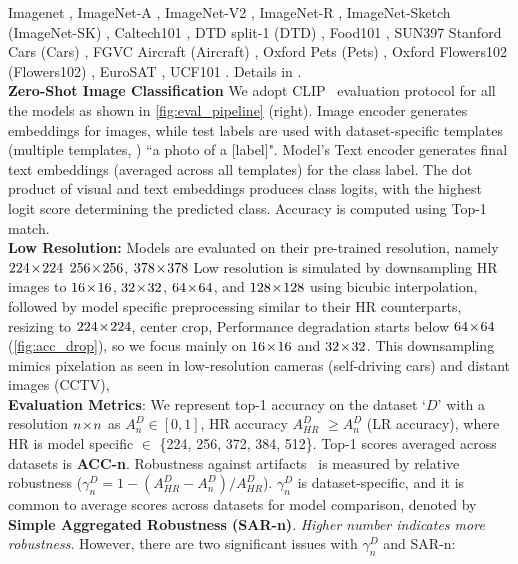 Imagenet , 
ImageNet-A , 
ImageNet-V2 , 
ImageNet-R , 
ImageNet-Sketch (ImageNet-SK) , 
Caltech101 , 
DTD split-1 (DTD) , 
Food101 , 
SUN397 
Stanford Cars (Cars) , 
FGVC Aircraft (Aircraft) ,
Oxford Pets (Pets) , 
Oxford Flowers102 (Flowers102) , 
EuroSAT , 
UCF101 . 
Details in \Supp. \vspace{4pt}\\         
\noindent\textbf{Zero-Shot Image Classification}
We adopt CLIP~\citep{radford2021learning} evaluation protocol for all the models as shown in \cref{fig:eval_pipeline} (right).
Image encoder generates embeddings for images, while test labels are used with dataset-specific templates (multiple templates, \Supp) \eg ``a photo of a [label]". Model’s Text encoder generates final text embeddings (averaged across all templates) for the class label.
The dot product of visual and text embeddings produces class logits, with the highest logit score determining the predicted class. 
Accuracy is computed using Top-1 match. \vspace{4pt} \\ 
\noindent \textbf{Low Resolution:}
Models are evaluated on their pre-trained resolution, namely $224\!\times\!224$ $256\!\times\!256$, $378\!\times\!378$ \etc 
Low resolution is simulated by downsampling HR images to $16\!\times\!16$, $32\!\times\!32$, $64\!\times\!64$, and $128\!\times\!128$ using bicubic interpolation, followed by model specific preprocessing similar to their HR counterparts, \eg resizing to $224\!\times\!224$, center crop, \etc 
Performance degradation starts below $64\!\times\!64$ (\cref{fig:acc_drop}), so we focus mainly on $16\!\times\!16$ and $32\!\times\!32$.
This downsampling mimics pixelation as seen in low-resolution cameras (\eg self-driving cars) and distant images (\eg CCTV), \etc \vspace{4pt}\\
\noindent \textbf{Evaluation Metrics}:
\label{sec:eval_metrics}
We represent top-1 accuracy on the dataset `$D$' with a resolution \underline{$n\!\times\! n$} as $A^{D}_{n}\in [0,1]$, \eg HR accuracy $A_{HR}^{D}$ $\ge A^{D}_{n}$ (LR accuracy), where HR is model specific $\in$ \{224, 256, 372, 384, 512\}. 
Top-1 scores averaged across datasets is \textbf{ACC-n}. 
Robustness against artifacts~\citep{schiappa2024robustness} is measured by relative robustness 
($\gamma_{n}^{D}=1-(A^{D}_{HR}- A^{D}_{n})/A^{D}_{HR}$).
$\gamma_{n}^{D}$ is dataset-specific, and it is common to average scores across datasets for model comparison, denoted by \textbf{Simple Aggregated Robustness (SAR-n)}.
\textit{Higher number indicates more robustness}.
However, there are two significant issues with $\gamma_{n}^{D}$ and SAR-n:





